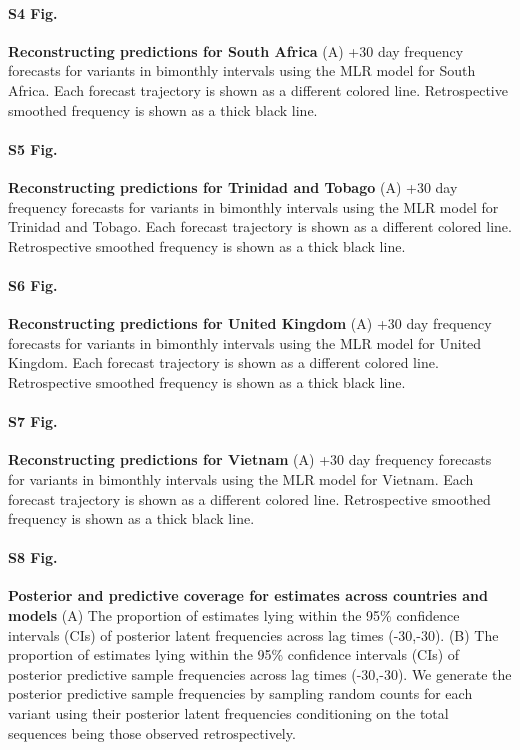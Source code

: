 \documentclass[10pt,letterpaper]{article}
\begin{document}
\paragraph*{S4 Fig.}
\label{fig:S4}
{\bf Reconstructing predictions for South Africa}
(A) +30 day frequency forecasts for variants in bimonthly intervals using the MLR model for South Africa.
		Each forecast trajectory is shown as a different colored line.
		Retrospective smoothed frequency is shown as a thick black line.
        
\paragraph*{S5 Fig.}
\label{fig:S4}
{\bf Reconstructing predictions for Trinidad and Tobago}
(A) +30 day frequency
forecasts for variants in bimonthly intervals using the MLR model for Trinidad and Tobago. Each
forecast trajectory is shown as a different colored line. Retrospective smoothed frequency is shown
as a thick black line.

\paragraph*{S6 Fig.}
\label{fig:S6}
{\bf Reconstructing predictions for United Kingdom}
(A) +30 day frequency forecasts for variants in bimonthly intervals using the MLR model for United Kingdom.
		Each forecast trajectory is shown as a different colored line.
		Retrospective smoothed frequency is shown as a thick black line.

        
\paragraph*{S7 Fig.}
\label{fig:S7}
{\bf Reconstructing predictions for Vietnam}
(A) +30 day frequency forecasts for variants in bimonthly intervals using the MLR model for Vietnam.
Each forecast trajectory is shown as a different colored line.
Retrospective smoothed frequency is shown as a thick black line.


\paragraph*{S8 Fig.}
\label{fig:S8}
{\bf Posterior and predictive coverage for estimates across countries and models}
(A) The proportion of estimates lying within the 95\% confidence intervals (CIs) of posterior latent frequencies across lag times (-30,-30).
(B) The proportion of estimates lying within the 95\% confidence intervals (CIs) of posterior predictive sample frequencies across lag times (-30,-30).
We generate the posterior predictive sample frequencies by sampling random counts for each variant using their posterior latent frequencies conditioning on the total sequences being those observed retrospectively.
\end{document}
